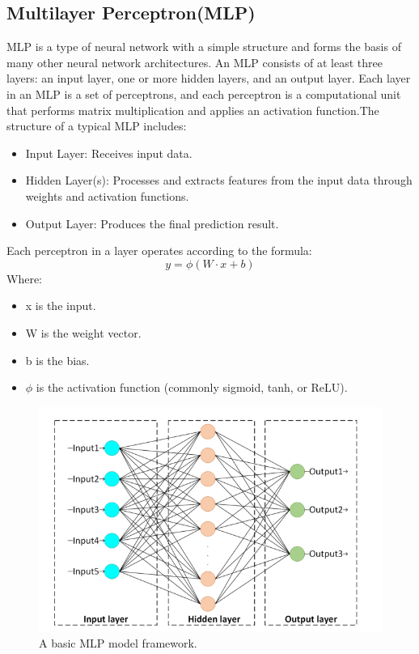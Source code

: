\documentclass{ieeeojies}
\begin{document}
\subsection{Multilayer Perceptron(MLP)}
MLP is a type of neural network with a simple structure and forms the basis of many other neural network architectures. An MLP consists of at least three layers: an input layer, one or more hidden layers, and an output layer. Each layer in an MLP is a set of perceptrons, and each perceptron is a computational unit that performs matrix multiplication and applies an activation function.The structure of a typical MLP includes:
\begin{itemize}
  \item Input Layer: Receives input data.
  \item Hidden Layer(s): Processes and extracts features from the input data through weights and activation functions.
  \item Output Layer: Produces the final prediction result.
\end{itemize}
Each perceptron in a layer operates according to the formula:
\[y = \phi(W \cdot x + b)\]
Where:
\begin{itemize}
  \item x is the input.
  \item W is the weight vector.
  \item b is the bias.
  \item \(\phi\) is the activation function (commonly sigmoid, tanh, or ReLU).\cite{b16, b22, b23}
\end{itemize}
\begin{figure}[H]
  \centering
  \begin{minipage}{0.8\linewidth}
    \centering
    \includegraphics[width=\linewidth]{Image/MLP/model.png}
    \caption{A basic MLP model framework.}
    \label{fig:7}
  \end{minipage}
\end{figure}
\end{document}
